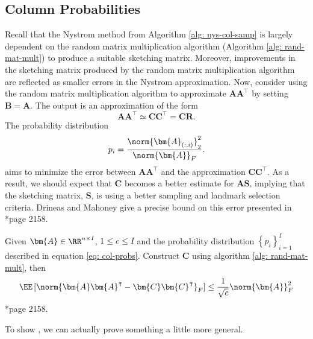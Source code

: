 \subsection{Column Probabilities}\label{Section2.2}

Recall that the Nystrom method from Algorithm \ref{alg: nys-col-samp} is largely dependent on the random matrix multiplication algorithm (Algorithm \ref{alg: rand-mat-mult}) to produce a suitable sketching matrix. Moreover, improvements in the sketching matrix produced by the random matrix multiplication algorithm are reflected as smaller errors in the Nystrom approximation. Now, consider using the random matrix multiplication algorithm to approximate $\bm{A} \bm{A}^{\intercal}$ by setting $\bm{B} = \bm{A}$. The output is an approximation of the form
\begin{equation*}
    \bm{A} \bm{A}^{\intercal} \simeq \bm{C} \bm{C}^{\intercal} = \bm{C} \bm{R}.
\end{equation*}
The probability distribution
\begin{equation*} \label{eq: col-probs}
    p_i = \frac{\norm{\bm{A}_{(:,i)}}_2^2}{\norm{\bm{A}}_F}.
\end{equation*}
aims to minimize the error between $\bm{A} \bm{A}^{\intercal}$ and the approximation $\bm{C} \bm{C}^{\intercal}$. As a result, we should expect that $\bm{C}$ becomes a better estimate for $\bm{A} \bm{S}$, implying that the sketching matrix, $\bm{S}$, is using a better sampling and landmark selection criteria. Drineas and Mahoney give a precise bound on this error presented in  \cite{JMLR:v6:drineas05a}*{page 2158}.

\begin{thm} \label{thm: col-pro-bounds}
    Given $\bm{A} \in \RR^{n \times I}$, $1 \leq c \leq I$ and the probability distribution $\left\{ p_i \right\}_{i=1}^{I}$ described in equation \ref{eq: col-probs}. Construct $\bm{C}$ using algorithm \ref{alg: rand-mat-mult}, then
    \[
        \EE \left[ \norm{\bm{A} \bm{A}^{\intercal} - \bm{C} \bm{C}^{\intercal}}_{F} \right] \leq \frac{1}{\sqrt{c}} \norm{\bm{A}}^2_{F}
    \]
    \cite{JMLR:v6:drineas05a}*{page 2158}.
\end{thm}

To show , we can actually prove something a little more general.

